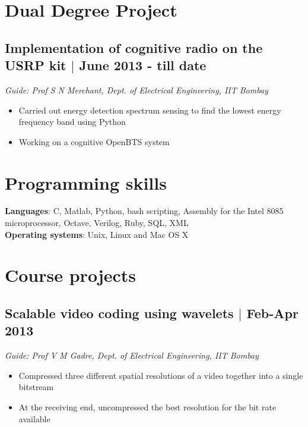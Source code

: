 \documentclass[11pt]{article}
\begin{document}
\setlength{\parindent}{0pt}


\vspace*{5\baselineskip}

\section*{Dual Degree Project}

\subsection*{Implementation of cognitive radio on the USRP kit $\vert$  June 2013 - till date}
\emph{Guide: Prof S N Merchant, Dept. of Electrical Engineering, IIT Bombay} 
\begin{itemize}
\item Carried out energy detection spectrum sensing to find the lowest energy frequency band  using Python
\item Working on a cognitive OpenBTS system 
\end{itemize}


\section*{Programming skills}


\textbf{Languages}: C, Matlab, Python, bash scripting, Assembly for the Intel 8085 microprocessor, Octave, Verilog, Ruby, SQL, XML  \\
\textbf{Operating systems}: Unix, Linux and Mac OS X


\section*{Course projects}

\subsection*{Scalable video coding using wavelets $\vert$  Feb-Apr 2013}
\emph{Guide: Prof V M Gadre, Dept. of Electrical Engineering, IIT Bombay} 
\begin{itemize} 
\item Compressed three different spatial resolutions of a video together into a single bitstream  
\item At the receiving end, uncompressed the best resolution for the bit rate available 
\end{itemize}
\end{document}

